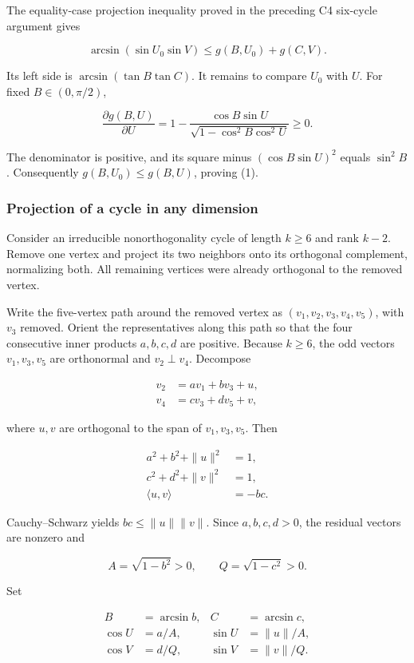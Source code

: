\documentclass[11pt,a4paper]{article}
\begin{document}
The equality-case projection inequality proved in the preceding C4 six-cycle argument gives

\[
\arcsin(\sin U_0\sin V)\le g(B,U_0)+g(C,V).
\]

Its left side is \(\arcsin(\tan B\tan C)\). It remains to compare \(U_0\) with \(U\). For fixed \(B\in(0,\pi/2)\),

\[
\frac{\partial g(B,U)}{\partial U}=1-\frac{\cos B\sin U}{\sqrt{1-\cos^2B\cos^2U}}\ge0.
\]

The denominator is positive, and its square minus \((\cos B\sin U)^2\) equals \(\sin^2 B\). Consequently \(g(B,U_0)\le g(B,U)\), proving (1).

\subsubsection{Projection of a cycle in any dimension}\label{projection-of-a-cycle-in-any-dimension}

Consider an irreducible nonorthogonality cycle of length \(k\ge6\) and rank \(k-2\). Remove one vertex and project its two neighbors onto its orthogonal complement, normalizing both. All remaining vertices were already orthogonal to the removed vertex.

Write the five-vertex path around the removed vertex as \((v_1,v_2,v_3,v_4,v_5)\), with \(v_3\) removed. Orient the representatives along this path so that the four consecutive inner products \(a,b,c,d\) are positive. Because \(k\ge6\), the odd vectors \(v_1,v_3,v_5\) are orthonormal and \(v_2\perp v_4\). Decompose

\[
\begin{aligned}v_2&=av_1+bv_3+u,\\v_4&=cv_3+dv_5+v,\end{aligned}
\]

where \(u,v\) are orthogonal to the span of \(v_1,v_3,v_5\). Then

\[
\begin{aligned}a^2+b^2+\|u\|^2&=1,\\c^2+d^2+\|v\|^2&=1,\\\langle u,v\rangle&=-bc.\end{aligned}
\]

Cauchy--Schwarz yields \(bc\le\|u\|\|v\|\). Since \(a,b,c,d>0\), the residual vectors are nonzero and

\[
A=\sqrt{1-b^2}>0,\qquad Q=\sqrt{1-c^2}>0.
\]

Set

\[
\begin{aligned}B&=\arcsin b,&C&=\arcsin c,\\\cos U&=a/A,&\sin U&=\|u\|/A,\\\cos V&=d/Q,&\sin V&=\|v\|/Q.\end{aligned}
\]
\end{document}
